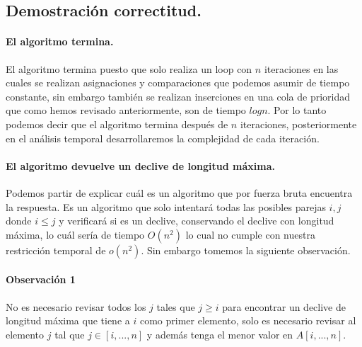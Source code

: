 \documentclass[12pt]{article}
\begin{document}
\subsection{Demostración correctitud.}
\paragraph{El algoritmo termina.} El algoritmo termina puesto que solo realiza un loop con $n$ iteraciones en las cuales se realizan asignaciones y comparaciones que podemos asumir de tiempo constante, sin embargo también se realizan inserciones en una cola de prioridad que como hemos revisado anteriormente, son de tiempo $logn$. Por lo tanto podemos decir que el algoritmo termina después de $n$ iteraciones, posteriormente en el análisis temporal desarrollaremos la complejidad de cada iteración.
\paragraph{El algoritmo devuelve un declive de longitud máxima.}
Podemos partir de explicar cuál es un algoritmo que por fuerza bruta encuentra la respuesta. Es un algoritmo que solo intentará todas las posibles parejas $i,j$ donde $i\leq j$ y verificará si es un declive, conservando el declive con longitud máxima, lo cuál sería de tiempo $O(n^2)$ lo cual no cumple con nuestra restricción temporal de $o(n^2)$. Sin embargo tomemos la siguiente observación.
\paragraph{Observación 1} No es necesario revisar todos los $j$ tales que $j \geq i$ para encontrar un declive de longitud máxima que tiene a $i$ como primer elemento, solo es necesario revisar al elemento $j$ tal que $j \in [i,...,n]$ y además tenga el menor valor en $A[i,...,n]$. 
\end{document}

